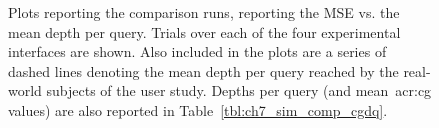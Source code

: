 \begin{figure}[p!]
    \centering
    \caption[Real-world comparisons over stopping strategies]{Plots reporting the comparison runs, reporting the MSE vs. the mean depth per query. Trials over each of the four experimental interfaces are shown. Also included in the plots are a series of dashed lines denoting the mean depth per query reached by the real-world subjects of the user study. Depths per query (and mean~\gls{acr:cg} values) are also reported in Table~\ref{tbl:ch7_sim_comp_cgdq}.}
    \label{fig:ch7_sim_comparison_plots}
\end{figure}

